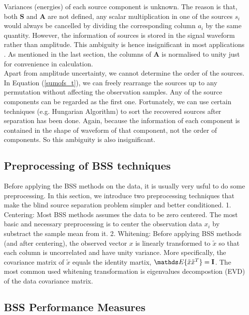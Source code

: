 Variances (energies) of each source component is unknown. The reason is that, both $\mathbf{S}$ and $\mathbf{A}$ are not defined, any scalar multiplication in one of the sources $s_i$ would always be cancelled by dividing the corresponding column $a_i$ by the same quantity. However, the information of sources is stored in the signal waveform rather than amplitude. This ambiguity is hence insignificant in most applications \cite{HYVARINEN2000411}. As mentioned in the last section, the columns of $\mathbf{A}$ is normalised to unity just for convenience in calculation.\\

Apart from amplitude uncertainty, we cannot determine the order of the sources. In Equation (\ref{sumofs_t}), we can freely rearrange the sources up to any permutation without affecting the observation samples. Any of the source components can be regarded as the first one. Fortunately, we can use certain techniques (e.g. Hungarian Algorithm) to sort the recovered sources after separation has been done. Again, because the information of each component is contained in the shape of waveform of that component, not the order of components. So this ambiguity is also insignificant.

\subsection{Preprocessing of BSS techniques}
Before applying the BSS methods on the data, it is usually very usful to do some preprocessing. In this section, we introduce two preprocessing techniques that make the blind source separation problem simpler and better conditioned.
1. Centering:
Most BSS methods assumes the data to be zero centered. The most basic and necessary preprocessing is to center the observation data $x_i$ by substract the sample mean from it. 
2. Whitening:
Before applying BSS methods (and after centering), the observed vector $x$ is linearly transformed to $\tilde{x}$ so that each column is uncorrelated and have unity variance. More specifically, the covariance matrix of $\tilde{x}$ equals the identity martix, $\E\{\tilde{x}\tilde{x}^T\} = \mathbf{I}$. The most common used whitening transformation is eigenvalues decompostion (EVD) of the data covariance matrix.

\subsection{BSS Performance Measures}
\label{perform_metric}

